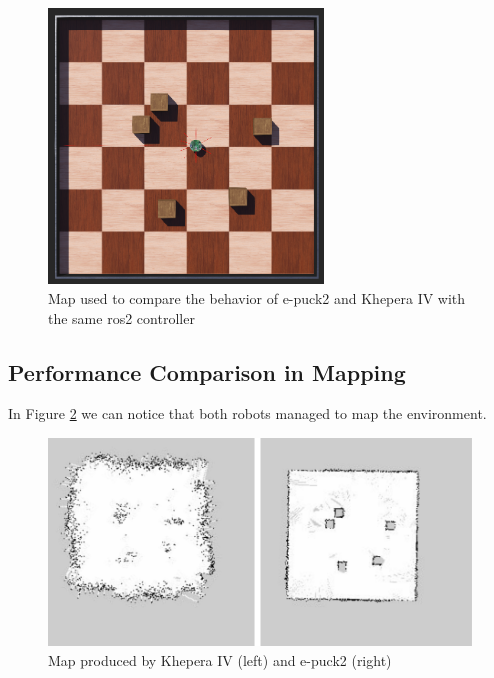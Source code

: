\begin{figure}[H]
    \centering
    \includegraphics[width=0.65\textwidth]{./results/figures/map_epuck_vs_khepera.png}
    \caption{Map used to compare the behavior of e-puck2 and Khepera IV with the same \ac{ros2} controller}
    \label{fig:results:map_epuck_vs_khepera}
\end{figure}

\subsection{Performance Comparison in Mapping}

In Figure \ref{fig:results:epuck2_vs_khepera4_map_results} we can notice that both robots managed to map the environment.

\begin{figure}[H]
    \centering
    \includegraphics[width=\textwidth]{./results/figures/epuck2_vs_khepera4_map_results}
    \caption{Map produced by Khepera IV (left) and e-puck2 (right)}
    \label{fig:results:epuck2_vs_khepera4_map_results}
\end{figure}

